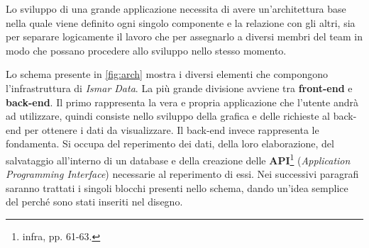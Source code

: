 \documentclass[./main.tex]{subfiles}
\begin{document}
 
Lo sviluppo di una grande applicazione necessita di avere un'architettura base nella quale viene definito ogni singolo componente e la relazione con gli altri, sia per separare logicamente il lavoro che per assegnarlo a diversi membri del team in modo che possano procedere allo sviluppo nello stesso momento. 

Lo schema presente in \autoref{fig:arch} mostra i diversi elementi che compongono l'infrastruttura di \textit{Ismar Data}. La più grande divisione avviene tra \textbf{front-end} e \textbf{back-end}. Il primo rappresenta la vera e propria applicazione che l'utente andrà ad utilizzare, quindi consiste nello sviluppo della grafica e delle richieste al back-end per ottenere i dati da visualizzare. Il back-end invece rappresenta le fondamenta. Si occupa del reperimento dei dati, della loro elaborazione, del salvataggio all'interno di un database e della creazione delle \textbf{API}\footnote{infra, pp. 61-63.} (\textit{Application Programming Interface}) necessarie al reperimento di essi. Nei successivi paragrafi saranno trattati i singoli blocchi presenti nello schema, dando un'idea semplice del perché sono stati inseriti nel disegno.\par
\end{document}
